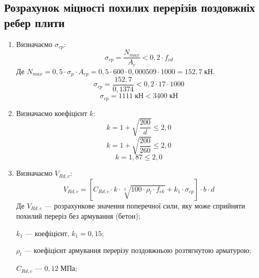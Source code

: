 \documentclass[a4paper,14pt]{article}
\begin{document}
\subsection{Розрахунок міцності похилих перерізів поздовжніх ребер плити}
\begin{enumerate}
    \item Визначаємо $\sigma_{cp}$:
        \begin{equation}
            \sigma_{cp} = \dfrac{N_{max}}{A_c} < 0,2 \cdot f_{cd}
        \end{equation}
        Де $N_{max} = 0,5 \cdot \sigma_p \cdot A_{cp} = 0,5 \cdot 600 \cdot 0,000509 \cdot 1000 = 152,7\;\textit{кН}$.
        $$ \sigma_{cp} = \dfrac{152,7}{0,1374} < 0,2 \cdot 17 \cdot 1000$$
        $$ \sigma_{cp} = 1111\;\textit{кН} < 3400\;\textit{кН}$$
    \item Визначаємо коефіцієнт $k$:
        \begin{equation}
            k = 1 + \sqrt{\dfrac{200}{d}} \leq 2,0
        \end{equation}
        $$k = 1 + \sqrt{\dfrac{200}{260}} \leq 2,0$$
        $$k = 1,87 \leq 2,0$$
    \item Визначаємо $V_{Rd,c}$:
        \begin{equation}
            V_{Rd,c} = \left[{C_{Rd,c} \cdot k \cdot \sqrt[3]{100 \cdot \rho_l \cdot f_{ck}}} + k_1 \cdot \sigma_{cp}\right] \cdot b \cdot d
        \end{equation}
        Де $V_{Rd,c}$ --- розрахункове значення поперечної сили, яку може сприйняти похилий переріз без армування (бетон);

        $k_1$ --- коефіцієнт, $k_1 = 0,15$;

        $\rho_l$ --- коефіцієнт армування перерізу поздовжньою розтягнутою арматурою;

        $C_{Rd,c}$ --- $0,12\;\textit{МПа}$;


\end{enumerate}
\end{document}
